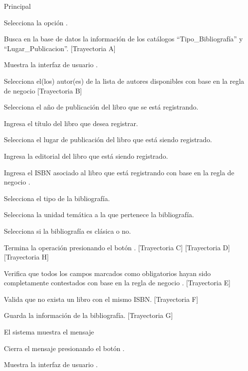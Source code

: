 \begin{UCtrayectoria}{Principal}

    \UCpaso[\UCactor] Selecciona la opción .

    \UCpaso Busca en la base de datos la información de los catálogos ``Tipo\_Bibliografía'' y ``Lugar\_Publicacion''. [Trayectoria A]

    \UCpaso Muestra la interfaz de usuario .

    \UCpaso[\UCactor] Selecciona el(los) autor(es) de la lista de autores disponibles con base en la regla de negocio  [Trayectoria B]
    
    \UCpaso[\UCactor] Selecciona el año de publicación del libro que se está registrando.
    
    \UCpaso[\UCactor] Ingresa el título del libro que desea registrar.
    
    \UCpaso[\UCactor] Selecciona el lugar de publicación del libro que está siendo registrado.
    
    \UCpaso[\UCactor] Ingresa la editorial del libro que está siendo registrado.

    \UCpaso[\UCactor] Ingresa el ISBN asociado al libro que está registrando con base en la regla de negocio .

    \UCpaso[\UCactor] Selecciona el tipo de la bibliografía.
    
    \UCpaso[\UCactor] Selecciona la unidad temática a la que pertenece la bibliografía.

    \UCpaso[\UCactor] Selecciona si la bibliografía es clásica o no.
    
    \UCpaso[\UCactor] Termina la operación presionando el botón . [Trayectoria C] [Trayectoria D] [Trayectoria H]

    \UCpaso Verifica que todos los campos marcados como obligatorios hayan sido completamente contestados con base en la regla de negocio . [Trayectoria E]

    \UCpaso Valida que no exista un libro con el mismo ISBN. [Trayectoria F]

    \UCpaso Guarda la información de la bibliografía. [Trayectoria G]

    \UCpaso El sistema muestra el mensaje 

    \UCpaso[\UCactor] Cierra el mensaje presionando el botón .

    \UCpaso Muestra la interfaz de usuario .
\end{UCtrayectoria}

